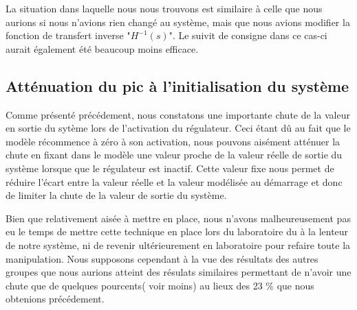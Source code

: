 La situation dans laquelle nous nous trouvons est similaire à celle que nous aurions si nous n'avions rien changé au système, mais que nous avions modifier la fonction de transfert inverse "$H^{-1}(s)$". Le suivit de consigne dans ce cas-ci aurait également été beaucoup moins efficace.
\subsection{Atténuation du pic à l'initialisation du système}

Comme présenté précédement, nous constatons une importante chute de la valeur en sortie du sytème lors de l'activation du régulateur. Ceci étant dû au fait que le modèle récommence à zéro à son activation, nous pouvons aisément atténuer la chute en fixant dans le modèle une valeur proche de la valeur réelle de sortie du système lorsque que le régulateur est inactif. Cette valeur fixe nous permet de réduire l'écart entre la valeur réelle et la valeur modélisée au démarrage et donc de limiter la chute de la valeur de sortie du système. 

Bien que relativement aisée à mettre en place, nous n'avons malheureusement pas eu le temps de mettre cette technique en place lors du laboratoire du à la lenteur de notre système, ni de revenir ultérieurement en laboratoire pour refaire toute la manipulation. Nous supposons cependant à la vue des résultats des autres groupes que nous aurions atteint des résulats similaires permettant de n'avoir une chute que de quelques pourcents( voir moins) au lieux des 23 \% que nous obtenions précédement. 






